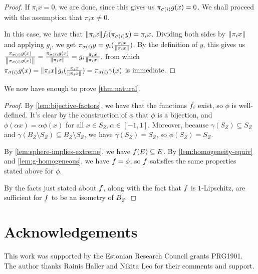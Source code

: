 \documentclass{amsart}
\theoremstyle{definition}
\begin{document}
\begin{proof}
	If $\pi_i x = 0$, we are done, since this gives us
	$\pi_{\sigma(i)} g(x) = 0$. We shall proceed with the assumption that
  $\pi_i x \neq 0$.

	In this case, we have that
  $\norm{\pi_i x}f_i (\pi_{\sigma(i)} y) = \pi_i x$.
	Dividing both sides by $\norm{\pi_i x}$ and applying $g_i$, we get
	$\pi_{\sigma(i)} y = g_i (\frac{\pi_i x}{\norm{\pi_i x}})$.
	By the definition of $y$, this gives us
  $ \frac{\pi_{\sigma(i)} g(x)}{\norm{{\pi_{\sigma(i)} g(x)}}} = \frac{\pi_{\sigma(i)} g(x)}{\norm{\pi_i x}} = g_i \frac{\pi_i x}{\norm{\pi_i x}}, $
	from which
	${\pi_{\sigma(i)} g(x)} = \norm{\pi_i x}g_i (\frac{\pi_i x}{\norm{\pi_i x}}) = \pi_{\sigma(i)} \gamma(x)$
	is immediate.
\end{proof}

We now have enough to prove \autoref{thm:natural}.

\begin{proof} 

  By \autoref{lem:bijective-factors}, we have that the functions $f_i$ exist,
  so $\phi$ is well-defined.
  It's clear by the construction of $\phi$ that $\phi$ is a bijection, and $\phi(\alpha x) = \alpha \phi(x)$
  for all $x \in S_Z, \alpha \in [-1,1]$. Moreover, because $\gamma(S_Z) \subseteq S_Z$ and $\gamma(B_Z\setminus S_Z) \subseteq B_Z \setminus S_Z$, we have $\gamma(S_Z) = S_Z$, so $\phi(S_Z) = S_Z$.

  

  By \autoref{lem:sphere-implies-extreme}, we have $f(E) \subseteq E$.
  By \autoref{lem:homogeneity-equiv} and \autoref{lem:g-homogeneous}, we have $f = \phi$,
  so $f$ satisfies the same properties stated above for $\phi$.

By \autocite[Lemma 2.5]{cascales:2016}
  the facts just stated about $f$, along with the fact that $f$ is $1$‑Lipschitz, are sufficient for $f$ to be an isometry of $B_Z$.
\end{proof}


\section*{Acknowledgements}

This work was supported by the Estonian Research Council grants PRG1901. The author thanks Rainis Haller and Nikita Leo for their comments and support.


\printbibliography
\end{document}
